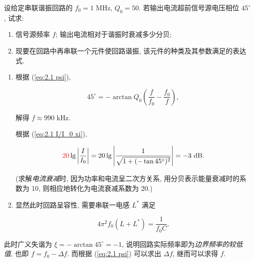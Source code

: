 \begin{exampleprob}
    设给定串联谐振回路的 $f_0=1$ MHz, $Q_0=50$. 若输出电流超前信号源电压相位 $45^\circ$, 试求:

    \begin{enumerate}
        \item 信号源频率 $f$; 输出电流相对于谐振时衰减多少分贝;
        \item 现要在回路中再串联一个元件使回路谐振, 该元件的种类及其参数满足的表达式.
    \end{enumerate}

    \begin{solution}[1]
        \begin{enumerate}
            \item 根据 (\ref{eq:2.1 psi}),

                  \begin{equation*}
                      45^\circ=-\arctan Q_0\left(\frac{f}{f_0}-\frac{f_0}{f}\right),
                  \end{equation*}

                  解得 $f\approx 990$ kHz.

                  根据 (\ref{eq:2.1 I/I_0 xi}),

                  \begin{equation*}
                      {\color{red} 20}\lg\left|\frac{I}{I_0}\right|=20\lg\left|\frac{1}{\sqrt{1+(-\tan 45^\circ)^2}}\right|=-3\ \mathrm{dB}.
                  \end{equation*}

                  (求解\textit{电流衰减}时, 因为功率和电流呈二次方关系, 用分贝表示能量衰减时的系数为 10, 则相应地转化为电流衰减系数为 20.)
            \item 显然此时回路呈容性, 需要串联一电感 $L^*$ 满足

                  \begin{equation*}
                      4\pi^2 f_0(L+L^*)=\frac{1}{f_0 C}.
                  \end{equation*}
        \end{enumerate}
    \end{solution}

    \begin{solution}[2]
        此时广义失谐为 $\xi=-\arctan 45^\circ=-1$, 说明回路实际频率即为\textit{边界频率的较低值}, 也即 $f=f_0-\Delta f$. 而根据 (\ref{eq:2.1 psi}) 可以求出 $\Delta f$, 继而可以求得 $f$.
    \end{solution}
\end{exampleprob}
